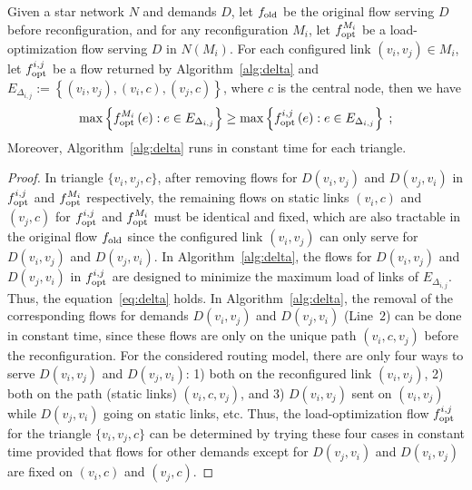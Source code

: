 \documentclass[sigconf]{acmart}
\begin{document}
\begin{lemma}
Given a star network $N$ and demands $D$, let $f_{\textnormal{old}}$ be the original flow serving $D$ before reconfiguration, and for any reconfiguration $M_i$, let $f^{M_i}_{\textnormal{opt}}$ be a load-optimization flow serving $D$ in $N(M_i)$.  For each configured link $(v_i,v_j)\in M_i$, let $f_{\textnormal{opt}}^{i,j}$ be a flow returned by Algorithm~\ref{alg:delta} and $E_{\Delta_{i,j}}:=\left\{(v_i,v_j), (v_i,c), (v_j,c)\right\}$, where $c$ is the central node,  then we have
\begin{equation}
    \max\left\{f^{M_i}_{\textnormal{opt}}\left(e\right): e\in E_{\Delta_{i,j}}\right\} \ge \max\left\{f_{\textnormal{opt}}^{i,j}\left(e\right): e\in E_{\Delta_{i,j}}\right\}\; ; \label{eq:delta}
\end{equation}
Moreover,  Algorithm~\ref{alg:delta} runs in constant time for each triangle. \label{lem:delta}
\end{lemma}
\begin{proof}
In triangle $\{v_i,v_j,c\}$, after removing flows for $D(v_i,v_j)$ and $D(v_j,v_i)$ in $f_{\textnormal{opt}}^{i,j}$ and $f^{M_i}_{\textnormal{opt}}$ respectively, the remaining flows on static links $(v_i,c)$ and $(v_j,c)$ for $f_{\textnormal{opt}}^{i,j}$ and $f^{M_i}_{\textnormal{opt}}$ must be identical and fixed, which are also tractable in the original flow $f_{\textnormal{old}}$ since the configured link $(v_i,v_j)$ can only serve for $D(v_i,v_j)$ and $D(v_j,v_i)$. In Algorithm~\ref{alg:delta}, the flows for $D(v_i,v_j)$ and $D(v_j,v_i)$ in $f_{\textnormal{opt}}^{i,j}$  are designed to minimize the maximum load of  links of $E_{\Delta_{i,j}}$. Thus, the equation~\eqref{eq:delta} holds.
%
In Algorithm~\ref{alg:delta}, the removal of the corresponding flows for demands $D(v_i,v_j)$ and $D(v_j,v_i)$ (Line~$2$) can be done in  constant time, since these flows are only on the unique path $(v_i,c,v_j)$ before the reconfiguration. For the considered routing model, there are only four ways to serve $D(v_i,v_j)$ and $D(v_j,v_i)$: 1) both on the reconfigured link $(v_i,v_j)$, 2) both on the path (static links) $(v_i,c,v_j)$, and 3) $D(v_i,v_j)$ sent on $(v_i,v_j)$ while $D(v_j,v_i)$ going on static links, etc. Thus, the load-optimization flow $f_{\textnormal{opt}}^{i,j}$ for the triangle $\{v_i,v_j,c\}$ can be determined by trying these four cases in constant time provided that flows for other demands except for $D(v_j,v_i)$ and $D(v_i,v_j)$ are fixed on $(v_i,c)$ and $(v_j,c)$.
\end{proof}
\end{document}
